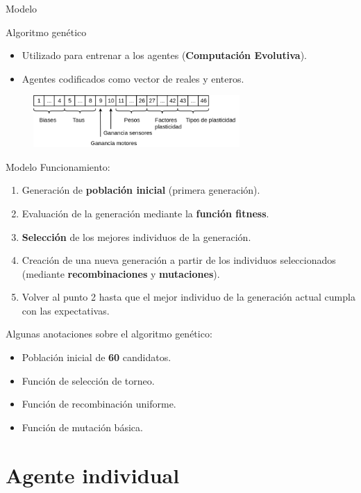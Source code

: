 \documentclass[aspectratio=169]{beamer}
\begin{document}
\begin{frame}{Modelo}
\begin{block}{Algoritmo genético}
  \begin{itemize}
    \item Utilizado para entrenar a los agentes (\textbf{Computación Evolutiva}).
    \item Agentes codificados como vector de reales y enteros.
  \end{itemize}
  \begin{figure}
    \centering
  \includegraphics[width=0.7\textwidth,height=.3\textheight]{Imagenes/vector0}
\end{figure}
\end{block}
\end{frame}

\begin{frame}{Modelo}
Funcionamiento:
  \begin{enumerate}
    \item Generación de \textbf{población inicial} (primera generación).
    \item Evaluación de la generación mediante la \textbf{función fitness}.
    \item \textbf{Selección} de los mejores individuos de la generación.
    \item Creación de una nueva generación a partir de los individuos seleccionados (mediante \textbf{recombinaciones} y \textbf{mutaciones}).
    \item Volver al punto 2 hasta que el mejor individuo de la generación actual cumpla con las expectativas.
  \end{enumerate}
  Algunas anotaciones sobre el algoritmo genético:
  \begin{itemize}
    \item Población inicial de \textbf{60} candidatos.
    \item Función de selección de torneo.
    \item Función de recombinación uniforme.
    \item Función de mutación básica.
  \end{itemize}
\end{frame}

\section{Agente individual}
\end{document}
